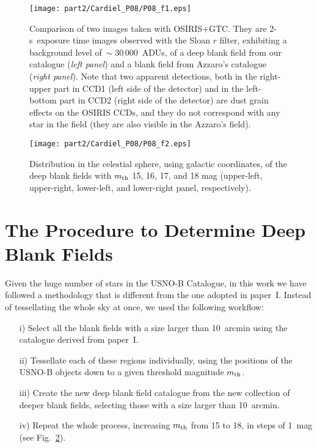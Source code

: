 \begin{figure}
\centerline{%
\texttt{[image: part2/Cardiel\_P08/P08\_f1.eps]}}
\caption{Comparison of two images taken with OSIRIS+GTC. They are \mbox{2-s
exposure} time images observed with the Sloan $r$ filter, exhibiting a
background level of$~\sim 30\,000$~ADUs, of a deep blank field from our
catalogue (\emph{left panel}) and a blank field from Azzaro's catalogue
(\emph{right panel}). Note that two apparent detections, both in the
right-upper part in CCD1 (left side of the detector) and in the left-bottom
part in CCD2 (right side of the detector) are dust grain effects on the OSIRIS
CCDs, and they do not correspond with any star in the field (they are also
visible in the Azzaro's field).}
\label{example_DBF}
\end{figure}

\begin{figure}
\centerline{%
\texttt{[image: part2/Cardiel\_P08/P08\_f2.eps]}}
\caption{Distribution in the celestial sphere, using galactic coordinates, of
the deep blank fields with $m_{\mbox{\scriptsize th}}$ 15, 16, 17, and 18 mag 
(upper-left, upper-right, lower-left, and lower-right panel, respectively).}
\label{result_DBF}
\end{figure}


\section{The Procedure to Determine Deep Blank Fields}

Given the huge number of stars in the USNO-B Catalogue, in this work we have
followed a methodology that is different from the one adopted in paper~I.
Instead of tessellating the whole sky at once, we
used the following workflow:
\begin{itemize}
  \item[i)] Select all the blank fields with a size larger than 10~arcmin using
  the catalogue derived from paper~I.
  \item[ii)] Tessellate each of these regions individually, using the positions
  of the USNO-B objects down to a given threshold magnitude
  $m_{\mbox{\scriptsize th}}$.
  \item[iii)] Create the new deep blank field catalogue from the new collection
  of deeper blank fields, selecting those with a size larger than 10~arcmin.
  \item[iv)] Repeat the whole process, increasing 
  $m_{\mbox{\scriptsize th}}$ from 15 to 18, in steps of 1~mag (see
  Fig.~\ref{result_DBF}).
\end{itemize}

